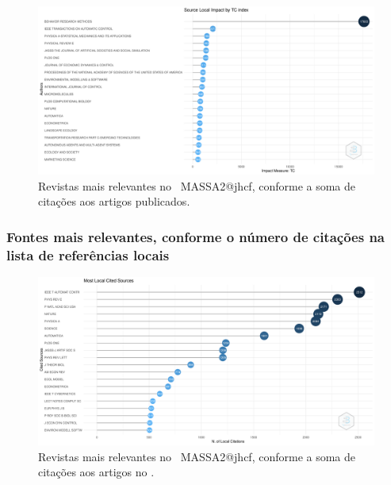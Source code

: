 \begin{figure}
    \centering
    \includegraphics[width=1\textwidth]{exploratory-data-analysis/jhcf/PesqBibliogr/SimulacaoMultiagente/WoS-20220203/Metricas/Sources/MASSA2-Total-Citation-Source-Local-Impact.png.png}
    \caption{Revistas mais relevantes no  \dataset\ MASSA2@jhcf, conforme a soma de citações aos artigos publicados.}
    \label{fig:MASSA2-Total-Citation-Source-Local-Impact.png}
\end{figure}

\subsubsection{Fontes mais relevantes, conforme o número de citações na lista de referências locais}

\begin{figure}
    \centering
    \includegraphics[width=1\textwidth]{exploratory-data-analysis/jhcf/PesqBibliogr/SimulacaoMultiagente/WoS-20220203/Metricas/Sources/MASSA2-Most-Local-Cited-Sources(from-Reference-Lists).png}
    \caption{Revistas mais relevantes no  \dataset\ MASSA2@jhcf, conforme a soma de citações aos artigos no \dataset.}
    \label{fig:MASSA2-Most-Local-Cited-Sources(from-Reference-Lists).png}
\end{figure}

